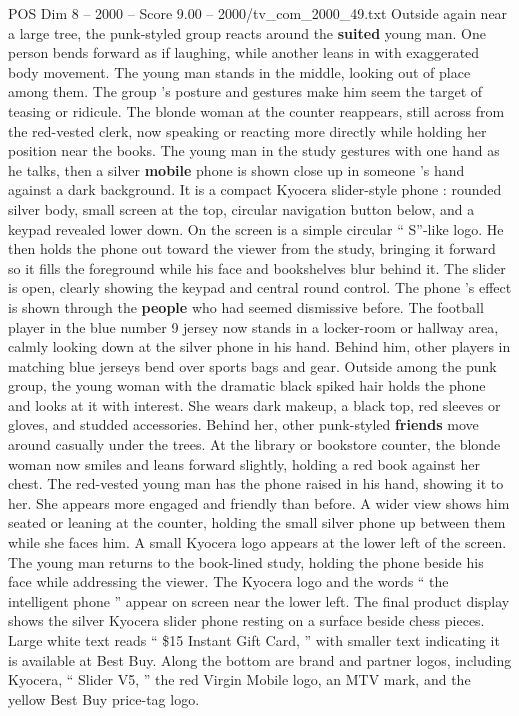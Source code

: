 \begin{textsample}{POS Dim 8 – 2000 – Score 9.00 – 2000/tv\_com\_2000\_49.txt}
Outside again near a large tree, the punk-styled group reacts around the \textbf{suited} young man.
One person bends forward as if laughing, while another leans in with exaggerated body movement.
The young man stands in the middle, looking out of place among them.
The group ’s posture and gestures make him seem the target of teasing or ridicule.
The blonde woman at the counter reappears, still across from the red-vested clerk, now speaking or reacting more directly while holding her position near the books.
The young man in the study gestures with one hand as he talks, then a silver \textbf{mobile} phone is shown close up in someone ’s hand against a dark background.
It is a compact Kyocera slider-style phone : rounded silver body, small screen at the top, circular navigation button below, and a keypad revealed lower down.
On the screen is a simple circular “ S”-like logo.
He then holds the phone out toward the viewer from the study, bringing it forward so it fills the foreground while his face and bookshelves blur behind it.
The slider is open, clearly showing the keypad and central round control.
The phone ’s effect is shown through the \textbf{people} who had seemed dismissive before.
The football player in the blue number 9 jersey now stands in a locker-room or hallway area, calmly looking down at the silver phone in his hand.
Behind him, other players in matching blue jerseys bend over sports bags and gear.
Outside among the punk group, the young woman with the dramatic black spiked hair holds the phone and looks at it with interest.
She wears dark makeup, a black top, red sleeves or gloves, and studded accessories.
Behind her, other punk-styled \textbf{friends} move around casually under the trees.
At the library or bookstore counter, the blonde woman now smiles and leans forward slightly, holding a red book against her chest.
The red-vested young man has the phone raised in his hand, showing it to her.
She appears more engaged and friendly than before.
A wider view shows him seated or leaning at the counter, holding the small silver phone up between them while she faces him.
A small Kyocera logo appears at the lower left of the screen.
The young man returns to the book-lined study, holding the phone beside his face while addressing the viewer.
The Kyocera logo and the words “ the intelligent phone ” appear on screen near the lower left.
The final product display shows the silver Kyocera slider phone resting on a surface beside chess pieces.
Large white text reads “ \$15 Instant Gift Card, ” with smaller text indicating it is available at Best Buy.
Along the bottom are brand and partner logos, including Kyocera, “ Slider V5, ” the red Virgin Mobile logo, an MTV mark, and the yellow Best Buy price-tag logo.

\end{textsample}
